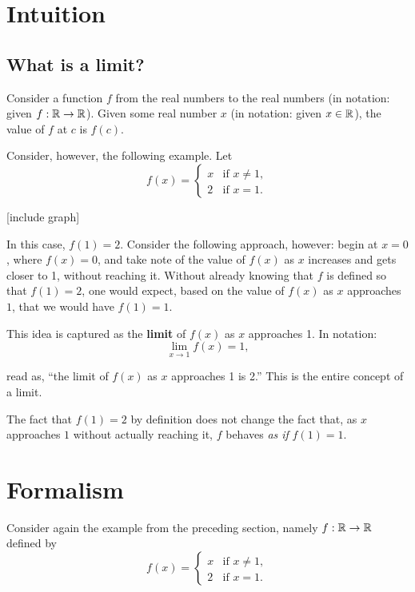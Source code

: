 \section{Intuition}
\subsection{What is a limit?}
Consider a function $f$ from the real numbers to the real numbers (in notation: given $f : \mathbb{R} \to \mathbb{R}$). Given some real number $x$ (in notation: given $x \in \mathbb{R}$), the value of $f$ at $c$ is $f(c)$. 

Consider, however, the following example. Let
\begin{equation}
f(x) = \left\{ \begin{matrix} x & \text{if } x \neq 1, \\ 2 & \text{if } x = 1. \end{matrix} \right.
\end{equation}

[include graph]

In this case, $f(1) = 2$. Consider the following approach, however: begin at $x = 0$, where $f(x) = 0$, and take note of the value of $f(x)$ as $x$ increases and gets closer to 1, without reaching it. Without already knowing that $f$ is defined so that $f(1) = 2$, one would expect, based on the value of $f(x)$ as $x$ approaches $1$, that we would have $f(1) = 1$. 

This idea is captured as the \textbf{limit} of $f(x)$ as $x$ approaches 1. In notation: 
\begin{equation}
  \lim_{x \to 1} f(x) = 1,
\end{equation}

read as, ``the limit of $f(x)$ as $x$ approaches 1 is 2.'' This is the entire concept of a limit.

The fact that $f(1) = 2$ by definition does not change the fact that, as $x$ approaches $1$ without actually reaching it, $f$ behaves \textit{as if} $f(1) = 1$. 

\section{Formalism}
Consider again the example from the preceding section, namely $f : \mathbb{R} \to \mathbb{R}$ defined by 
\begin{equation*}
f(x) = \left\{ \begin{matrix} x & \text{if } x \neq 1, \\ 2 & \text{if } x = 1. \end{matrix} \right.
\end{equation*}


